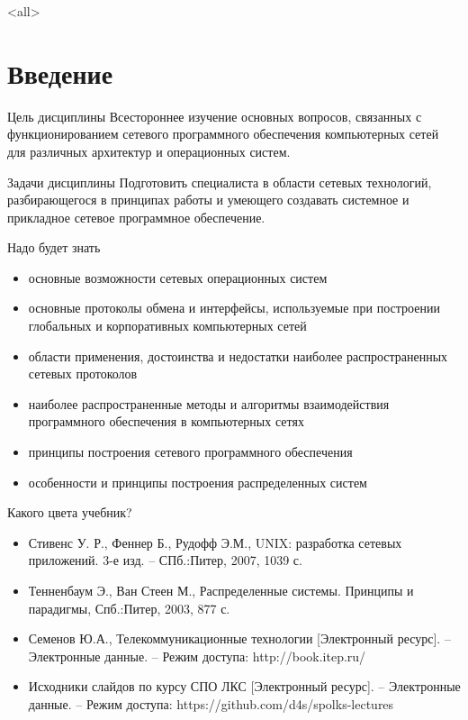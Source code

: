 
\subtitle{Введение}



\mode<all>{}

%
%
\section{Введение}

\begin{frame}{Цель дисциплины}
	Всестороннее изучение основных вопросов, связанных с функционированием сетевого программного обеспечения компьютерных сетей для различных архитектур и операционных систем.
\end{frame}

\begin{frame}{Задачи дисциплины}
	Подготовить специалиста в области сетевых технологий,  разбирающегося в принципах работы и умеющего создавать системное и прикладное сетевое программное обеспечение.
\end{frame}

\begin{frame}{Надо будет знать}
	\begin{itemize}
		\item основные возможности сетевых операционных систем
		\item основные протоколы обмена и интерфейсы, используемые при построении глобальных и корпоративных компьютерных сетей
		\item области применения,  достоинства и недостатки наиболее распространенных сетевых протоколов
		\item наиболее распространенные методы и алгоритмы взаимодействия программного обеспечения в компьютерных сетях
		\item принципы построения сетевого программного обеспечения
		\item особенности и принципы построения распределенных систем
	\end{itemize}
\end{frame}

\begin{frame}{Какого цвета учебник?}
	\begin{itemize}
		\item Стивенс У. Р.,  Феннер Б.,  Рудофф Э.М.,  UNIX: разработка сетевых приложений. 3-е изд. – СПб.:Питер,  2007,  1039 с.
		\item Тенненбаум Э.,  Ван Стеен М.,  Распределенные системы. Принципы и парадигмы,  Спб.:Питер,  2003,  877 с.
		\item Семенов Ю.А.,  Телекоммуникационные технологии [Электронный ресурс]. – Электронные данные. – Режим доступа: http://book.itep.ru/
		\item Исходники слайдов по курсу СПО ЛКС [Электронный ресурс]. – Электронные данные. – Режим доступа: https://github.com/d4s/spolks-lectures
	\end{itemize}
\end{frame}


